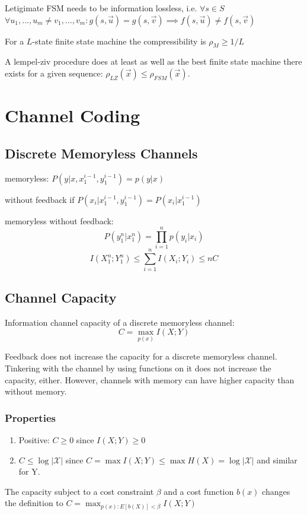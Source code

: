 \documentclass[10pt,a4paper,landscape]{article}
\begin{document}
\begin{multicols*}{4}
Letigimate FSM needs to be information lossless, i.e. $\forall s \in S$ $\forall u_1, ..., u_m \neq v_1, ..., v_m: g(s, \vec u) = g(s, \vec v) \implies f(s, \vec u) \neq f(s, \vec v)$

For a $L$-state finite state machine the compressibility is $\rho_M \geq 1/L$

A lempel-ziv procedure does at least as well as the best finite state machine there exists for a given sequence: $\rho_{LZ}(\vec x) \leq \rho_{FSM}(\vec x)$.

\section{Channel Coding}
\subsection{Discrete Memoryless Channels}
memoryless: $P(y|x, x_1^{i-1}, y_1^{i-1}) = p(y|x)$

without feedback if $P(x_i|x_1^{i-1},y_1^{i-1}) = P(x_i|x_1^{i-1})$

memoryless without feedback: $$P(y_1^n | x_1^n) = \prod_{i=1}^n p(y_i|x_i)$$
$$I(X_1^n;Y_1^n) \leq \sum_{i=1}^n I(X_i;Y_i) \leq nC$$

\subsection{Channel Capacity}
Information channel capacity of a discrete memoryless channel:
$$C = \max_{p(x)} I(X; Y)$$

Feedback does not increase the capacity for a discrete memoryless channel. Tinkering with the channel by using functions on it does not increase the capacity, either. However, channels with memory can have higher capacity than without memory.

\subsubsection{Properties}
\begin{enumerate}
	\item Positive: $C \geq 0$ since $I(X; Y) \geq 0$
	\item $C \leq \log | \mathcal{X} |$ since $C = \max I(X; Y) \leq \max H(X) =  \log | \mathcal{X} |$ and similar for Y.
\end{enumerate}

The capacity subject to a cost constraint $\beta$ and a cost function $b(x)$ changes the definition to $C = \max_{p(x): E[b(X)] < \beta} I(X; Y)$


\end{multicols*}
\end{document}
